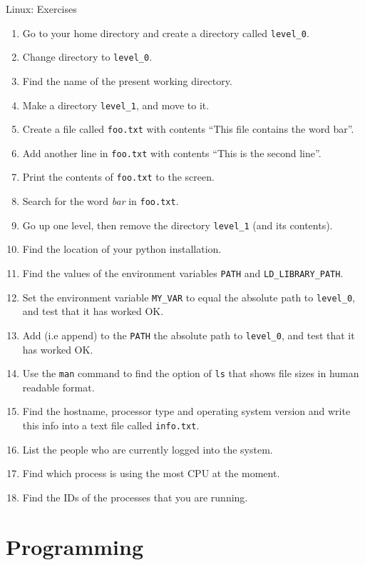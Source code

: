 \documentclass{beamer}
\begin{document}
\begin{frame}[allowframebreaks,t]{Linux: Exercises}
  \begin{enumerate}
    \item Go to your home directory and create a directory called \texttt{level\_0}.
    \item Change directory to \texttt{level\_0}.
    \item Find the name of the present working directory.
    \item Make a directory \texttt{level\_1}, and move to it.
    \item Create a file called \texttt{foo.txt} with contents ``This file contains the word bar''.
    \item Add another line in \texttt{foo.txt} with contents ``This is the second line''.
    \item Print the contents of \texttt{foo.txt} to the screen.
    \item Search for the word \emph{bar} in \texttt{foo.txt}.
    \item Go up one level, then remove the directory \texttt{level\_1} (and its contents).
    \item Find the location of your python installation.
    \item Find the values of the environment variables \texttt{PATH} and \texttt{LD\_LIBRARY\_PATH}.
    \item Set the environment variable \texttt{MY\_VAR} to equal the absolute path to \texttt{level\_0}, and test that it has worked OK.
    \item Add (i.e append) to the \texttt{PATH} the absolute path to \texttt{level\_0}, and test that it has worked OK.
    \item Use the \texttt{man} command to find the option of \texttt{ls} that shows file sizes in human readable format.
    \item Find the hostname, processor type and operating system version and write this info into a text file called \texttt{info.txt}.
    \item List the people who are currently logged into the system.
    \item Find which process is using the most CPU at the moment.
    \item Find the IDs of the processes that you are running.
  \end{enumerate}
\end{frame}

\section{Programming}
\end{document}
